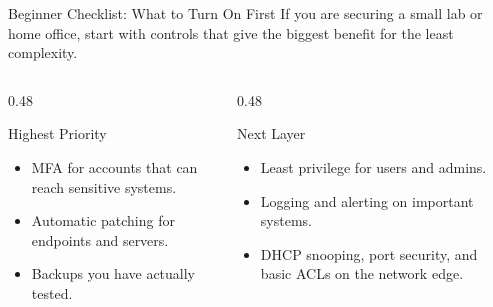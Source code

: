\documentclass[aspectratio=169]{beamer}  %
\begin{document}
\begin{frame}{Beginner Checklist: What to Turn On First}
    \footnotesize
    If you are securing a small lab or home office, start with controls that give the biggest benefit for the least complexity.

    \vspace{0.4em}
    \begin{columns}[T]
        \begin{column}{0.48\textwidth}
            \begin{block}{Highest Priority}
                \begin{itemize}
                    \item MFA for accounts that can reach sensitive systems.
                    \item Automatic patching for endpoints and servers.
                    \item Backups you have actually tested.
                \end{itemize}
            \end{block}
        \end{column}
        \begin{column}{0.48\textwidth}
            \begin{block}{Next Layer}
                \begin{itemize}
                    \item Least privilege for users and admins.
                    \item Logging and alerting on important systems.
                    \item DHCP snooping, port security, and basic ACLs on the network edge.
                \end{itemize}
            \end{block}
        \end{column}
    \end{columns}
\end{frame}
\end{document}

